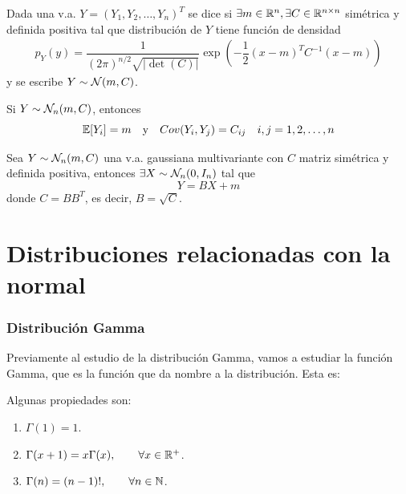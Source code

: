 \begin{definicion}
    Dada una v.a. $Y=(Y_1, Y_2, \ldots, Y_n)^T$ se dice  si $\exists m\in \mathbb{R}^n, \exists C\in \mathbb{R}^{n\times n}$ simétrica y definida positiva tal que distribución de $Y$ tiene función de densidad 
    \begin{align*}
        p_Y(y) = \dfrac{1}{(2\pi)^{n/2} \sqrt{|\det(C)|}} \exp\left( -\dfrac{1}{2} (x - m)^T C^{-1} (x - m) \right)
    \end{align*}
    y se escribe $Y \sim \mathcal{N}(m, C)$.
\end{definicion}

\begin{observacion}
    Si $Y\sim \mathcal{N}_n(m,C)$, entonces 
    \begin{equation*}
        \mathbb{E}[Y_i]=m \quad \text{y} \quad Cov(Y_i,Y_j)=C_{ij} \quad  i,j=1,2,\ldots,n
    \end{equation*}
\end{observacion}

\begin{prop}
    Sea $Y\sim \mathcal{N}_n(m,C)$ una v.a. gaussiana multivariante con $C$ matriz simétrica y definida positiva, entonces $\exists X\sim \mathcal{N}_n(0,I_n)$ tal que 
    \begin{equation*}
        Y = B X + m
    \end{equation*}
    donde $C=BB^T$, es decir, $B=\sqrt{C}$.
\end{prop}

\section{Distribuciones relacionadas con la normal}

\subsubsection{Distribución Gamma}
\noindent
Previamente al estudio de la distribución Gamma, vamos a estudiar la función Gamma, que es la función que da nombre a la distribución.
Esta es:


Algunas propiedades son:
\begin{enumerate}
    \item $\Gamma(1) = 1$. \label{prop:gamma1}
    \item $\Gamma(x+1) = x\Gamma(x),\qquad \forall x\in \mathbb{R}^+$. \label{prop:gamma2}
    \item $\Gamma(n) = (n-1)!,\qquad \forall n\in \mathbb{N}$. \label{prop:gamma3}
\end{enumerate}

